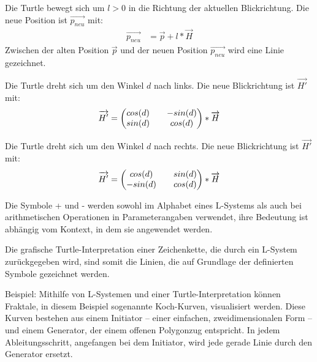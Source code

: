 \begin{description}[labelindent]
	\item[\boldmath$F(l)$] Die Turtle bewegt sich um $l>0$ in die Richtung der aktuellen Blickrichtung. Die neue Position ist  $\overrightarrow{p_{neu}}$ mit:
	\begin{equation}
	\begin{array}{ll}
	\overrightarrow{p_{neu}} & = \overrightarrow{p} + l * \overrightarrow{H}
	\end{array}
	\end{equation} 
	Zwischen der alten Position $\overrightarrow{p}$ und der neuen Position $\overrightarrow{p_{neu}}$ wird eine Linie gezeichnet.\\
	
	\item[\boldmath$+(d)$]  Die Turtle dreht sich um den Winkel $d$ nach links. Die neue Blickrichtung ist $\overrightarrow{H'}$ mit:
	\begin{equation}
	\overrightarrow{H'} = 
	\setlength\arraycolsep{10pt}
	\begin{pmatrix}
	cos(d) & -sin(d)\\
	sin(d) & cos(d)
	\end{pmatrix}
	* \overrightarrow{H}
	\end{equation} 
	
	\item[\boldmath$-(d)$]  Die Turtle dreht sich um den Winkel $d$ nach rechts. Die neue Blickrichtung ist $\overrightarrow{H'}$ mit:
	\begin{equation}
	\overrightarrow{H'} = 
	\setlength\arraycolsep{10pt}
	\begin{pmatrix}
	cos(d) & sin(d)\\
	-sin(d) & cos(d)
	\end{pmatrix}
	* \overrightarrow{H}
	\end{equation} 
	
\end{description}
\cite[S.4,46]{Turtle:04} \cite[S.7]{ABOP:04}
Die Symbole \glqq+\grqq{} und \glqq-\grqq{} werden sowohl im Alphabet eines L-Systems als auch bei arithmetischen Operationen in Parameterangaben verwendet, ihre Bedeutung ist abhängig vom Kontext, in dem sie angewendet werden. \cite[S.46]{ABOP:04}

Die grafische Turtle-Interpretation einer Zeichenkette, die durch ein L-System zurückgegeben wird, sind somit die Linien, die auf Grundlage der definierten Symbole gezeichnet werden. 

Beispiel: Mithilfe von L-Systemen und einer Turtle-Interpretation können Fraktale, in diesem Beispiel sogenannte Koch-Kurven, visualisiert werden. Diese Kurven bestehen aus einem Initiator -- einer einfachen, zweidimensionalen Form -- und einem Generator, der einem offenen Polygonzug entspricht. In jedem Ableitungsschritt, angefangen bei dem Initiator, wird jede gerade Linie durch den Generator ersetzt. \cite[S.39]{Mandelbrot:16} 

